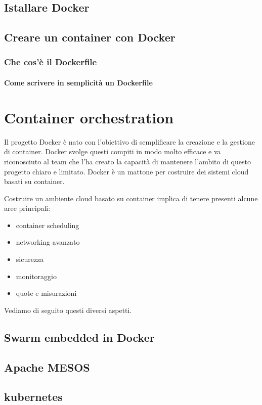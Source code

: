 \documentclass[a4paper,12pt,openright,twoside]{report}
\begin{document}
\section{Istallare Docker}

\section{Creare un container con Docker}

\subsection{Che cos'è il Dockerfile}

\subsubsection{Come scrivere in semplicità un Dockerfile}

\chapter{Container orchestration}
Il progetto Docker è nato con l’obiettivo di semplificare la creazione e la gestione di container. Docker svolge questi compiti in modo molto efficace e va riconosciuto al team che l’ha creato la capacità di mantenere l’ambito di questo progetto chiaro e limitato. Docker è un mattone per costruire dei sistemi cloud basati su container.

Costruire un ambiente cloud basato su container implica di tenere presenti alcune aree principali:
\begin{itemize}
\item container scheduling
\item networking avanzato
\item sicurezza
\item monitoraggio
\item quote e misurazioni
\end{itemize}
Vediamo di seguito questi diversi aspetti.

\section{Swarm embedded in Docker}

\section{Apache MESOS}

\section{kubernetes}

\end{document}
